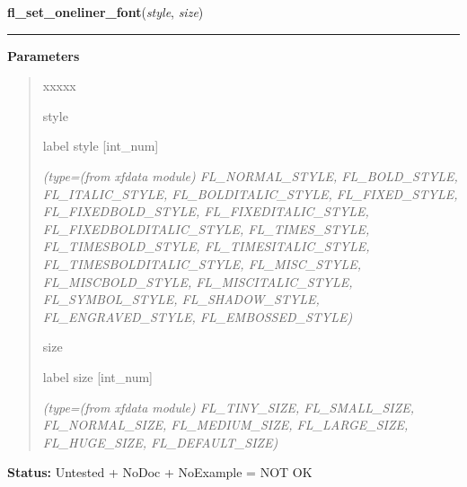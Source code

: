\hspace{.8\funcindent}\begin{boxedminipage}{\funcwidth}

    \raggedright \textbf{fl\_set\_oneliner\_font}(\textit{style}, \textit{size})

    \vspace{-1.5ex}

    \rule{\textwidth}{0.5\fboxrule}
\setlength{\parskip}{2ex}
\setlength{\parskip}{1ex}
      \textbf{Parameters}
      \vspace{-1ex}

      \begin{quote}
        \begin{Ventry}{xxxxx}

          \item[style]

          label style [int\_num]

            {\it (type=(from xfdata module) FL\_NORMAL\_STYLE, FL\_BOLD\_STYLE, FL\_ITALIC\_STYLE,
FL\_BOLDITALIC\_STYLE, FL\_FIXED\_STYLE, FL\_FIXEDBOLD\_STYLE, 
FL\_FIXEDITALIC\_STYLE, FL\_FIXEDBOLDITALIC\_STYLE, FL\_TIMES\_STYLE, 
FL\_TIMESBOLD\_STYLE, FL\_TIMESITALIC\_STYLE, FL\_TIMESBOLDITALIC\_STYLE, 
FL\_MISC\_STYLE, FL\_MISCBOLD\_STYLE, FL\_MISCITALIC\_STYLE, 
FL\_SYMBOL\_STYLE, FL\_SHADOW\_STYLE, FL\_ENGRAVED\_STYLE, 
FL\_EMBOSSED\_STYLE)}

          \item[size]

          label size [int\_num]

            {\it (type=(from xfdata module) FL\_TINY\_SIZE, FL\_SMALL\_SIZE, FL\_NORMAL\_SIZE, 
FL\_MEDIUM\_SIZE, FL\_LARGE\_SIZE, FL\_HUGE\_SIZE, FL\_DEFAULT\_SIZE)}

        \end{Ventry}

      \end{quote}

\textbf{Status:} Untested + NoDoc + NoExample = NOT OK



    \end{boxedminipage}

    \label{xformslib:library:fl_set_oneliner_color}

    \vspace{0.5ex}

